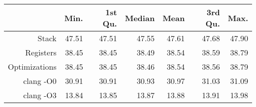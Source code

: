 \begin{table}[ht]
\centering
\begin{tabular}{rrrrrrr}
  \hline
 & Min. & 1st Qu. & Median & Mean & 3rd Qu. & Max. \\ 
  \hline
Stack & 47.51 & 47.51 & 47.55 & 47.61 & 47.68 & 47.90 \\ 
  Registers & 38.45 & 38.45 & 38.49 & 38.54 & 38.59 & 38.79 \\ 
  Optimizations & 38.45 & 38.45 & 38.46 & 38.54 & 38.56 & 38.79 \\ 
  clang -O0 & 30.91 & 30.91 & 30.93 & 30.97 & 31.03 & 31.09 \\ 
  clang -O3 & 13.84 & 13.85 & 13.87 & 13.88 & 13.91 & 13.98 \\ 
   \hline
\end{tabular}
\end{table}
